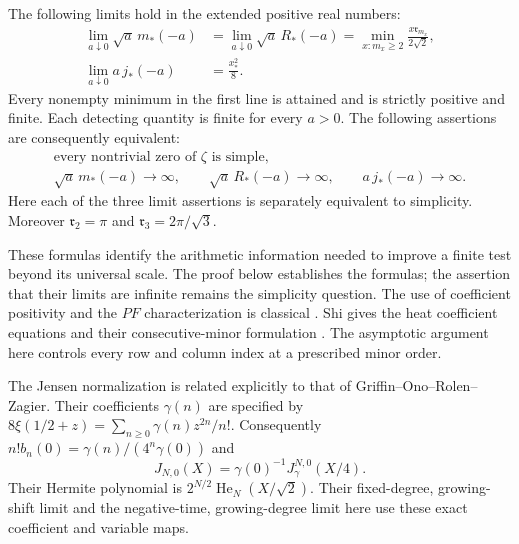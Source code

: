 \begin{theorem}\label{thm:fd-limits}
The following limits hold in the extended positive real numbers:
\[
 \begin{split}
 \lim_{a\downarrow0}\sqrt a\,m_*(-a)
 &=\lim_{a\downarrow0}\sqrt a\,R_*(-a)
   =\min_{x:m_x\ge2}\frac{x\mathfrak r_{m_x}}{2\sqrt2},\\
 \lim_{a\downarrow0}a\,j_*(-a)&=\frac{x_*^2}{8}.
 \end{split}
\]
Every nonempty minimum in the first line is attained and is strictly
positive and finite.  Each detecting quantity is finite for every $a>0$.
The following assertions are consequently equivalent:
\[
 \begin{gathered}
 \text{every nontrivial zero of $\zeta$ is simple},\\
 \sqrt a\,m_*(-a)\longrightarrow\infty,\qquad
 \sqrt a\,R_*(-a)\longrightarrow\infty,\qquad
 a\,j_*(-a)\longrightarrow\infty.
 \end{gathered}
\]
Here each of the three limit assertions is separately equivalent to simplicity.
Moreover $\mathfrak r_2=\pi$ and $\mathfrak r_3=2\pi/\sqrt3$.
\end{theorem}

These formulas identify the arithmetic information needed to improve a
finite test beyond its universal scale.  The proof below establishes the
formulas; the assertion that their limits are infinite remains the simplicity question.
The use of coefficient positivity and the $PF$ characterization is classical
\cite{Edrei1953}.  Shi gives the heat coefficient equations and their
consecutive-minor formulation \cite{Shi2026}.  The asymptotic argument
here controls every row and column index at a prescribed minor order.


The Jensen normalization is related explicitly to that of
Griffin--Ono--Rolen--Zagier. Their coefficients $\gamma(n)$ are
specified by $8\xi(1/2+z)=\sum_{n\ge0}\gamma(n)z^{2n}/n!$.
Consequently $n!b_n(0)=\gamma(n)/(4^n\gamma(0))$ and
\[
 J_{N,0}(X)=\gamma(0)^{-1}J_\gamma^{N,0}(X/4).
\]
Their Hermite polynomial is
$2^{N/2}\operatorname{He}_N(X/\sqrt2)$.
Their fixed-degree, growing-shift limit
\cite[Theorem~3, p.~2]{griffin-ono-rolen-zagier2019} and the
negative-time, growing-degree limit here use these exact coefficient
and variable maps.
